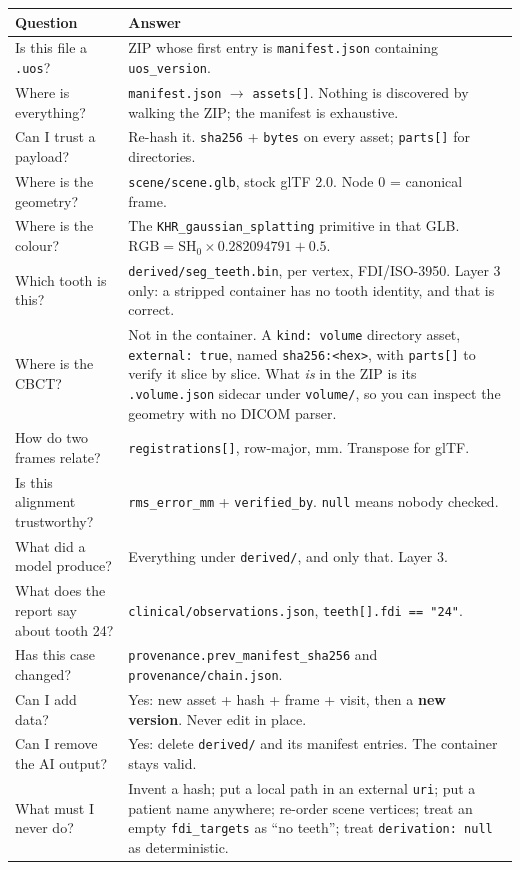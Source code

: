 \documentclass[11pt,a4paper]{article}
\newcommand{\code}[1]{\texttt{\small #1}}
\begin{document}
\begin{longtable}{L{4.6cm} L{10.8cm}}
\toprule
\textbf{Question} & \textbf{Answer}\\
\midrule
\endhead
Is this file a \code{.uos}? & ZIP whose first entry is \code{manifest.json} containing
\code{uos\_version}.\\
Where is everything? & \code{manifest.json} $\to$ \code{assets[]}. Nothing is discovered by
walking the ZIP; the manifest is exhaustive.\\
Can I trust a payload? & Re-hash it. \code{sha256} + \code{bytes} on every asset;
\code{parts[]} for directories.\\
Where is the geometry? & \code{scene/scene.glb}, stock glTF 2.0. Node 0 = canonical frame.\\
Where is the colour? & The \code{KHR\_gaussian\_splatting} primitive in that GLB.
$\mathrm{RGB} = \mathrm{SH}_0 \times 0.282094791 + 0.5$.\\
Which tooth is this? & \code{derived/seg\_teeth.bin}, per vertex, FDI/ISO-3950. Layer 3
only: a stripped container has no tooth identity, and that is correct.\\
Where is the CBCT? & Not in the container. A \code{kind: volume} directory asset,
\code{external: true}, named \code{sha256:<hex>}, with \code{parts[]} to verify it
slice by slice. What \emph{is} in the ZIP is its \code{.volume.json} sidecar under
\code{volume/}, so you can inspect the geometry with no DICOM parser.\\
How do two frames relate? & \code{registrations[]}, row-major, mm. Transpose for glTF.\\
Is this alignment trustworthy? & \code{rms\_error\_mm} + \code{verified\_by}. \code{null}
means nobody checked.\\
What did a model produce? & Everything under \code{derived/}, and only that. Layer 3.\\
What does the report say about tooth 24? & \code{clinical/observations.json},
\code{teeth[].fdi == "24"}.\\
Has this case changed? & \code{provenance.prev\_manifest\_sha256} and
\code{provenance/chain.json}.\\
Can I add data? & Yes: new asset + hash + frame + visit, then a \textbf{new version}. Never
edit in place.\\
Can I remove the AI output? & Yes: delete \code{derived/} and its manifest entries. The
container stays valid.\\
What must I never do? & Invent a hash; put a local path in an external \code{uri}; put a
patient name anywhere; re-order scene vertices; treat an empty \code{fdi\_targets} as ``no
teeth''; treat \code{derivation: null} as deterministic.\\
\bottomrule
\end{longtable}
\end{document}

